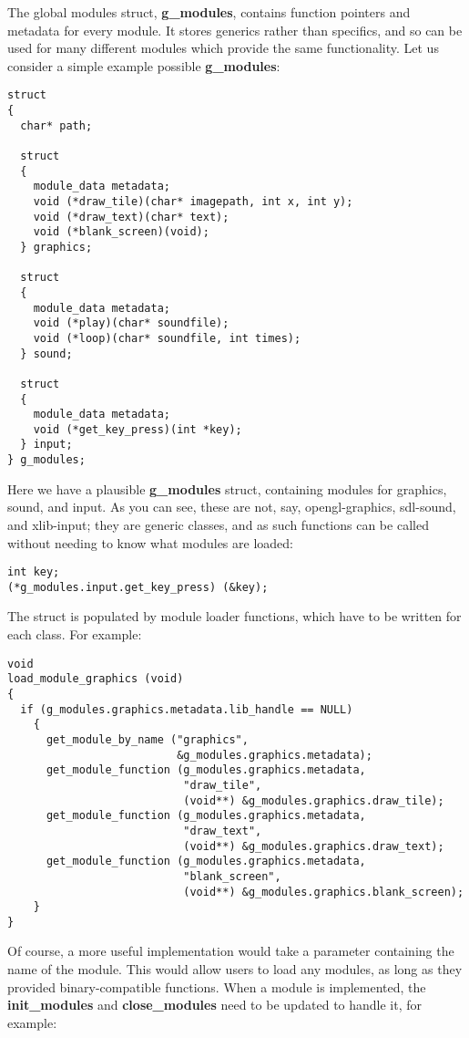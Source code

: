 \documentclass[12pt,a4paper]{article}
\begin{document}
The global modules struct, \textbf{g\_modules}, contains function pointers and metadata for every module. It stores generics rather than specifics, and so can be used for many different modules which provide the same functionality. Let us consider a simple example possible \textbf{g\_modules}:

\begin{lstlisting}
struct
{
  char* path;

  struct
  {
    module_data metadata;
    void (*draw_tile)(char* imagepath, int x, int y);
    void (*draw_text)(char* text);
    void (*blank_screen)(void);
  } graphics;

  struct
  {
    module_data metadata;
    void (*play)(char* soundfile);
    void (*loop)(char* soundfile, int times);
  } sound;

  struct
  {
    module_data metadata;
    void (*get_key_press)(int *key);
  } input;
} g_modules;
\end{lstlisting}

Here we have a plausible \textbf{g\_modules} struct, containing modules for graphics, sound, and input. As you can see, these are not, say, opengl-graphics, sdl-sound, and xlib-input; they are generic classes, and as such functions can be called without needing to know what modules are loaded:

\begin{lstlisting}
int key;
(*g_modules.input.get_key_press) (&key);
\end{lstlisting}

The struct is populated by module loader functions, which have to be written for each class. For example:

\begin{lstlisting}
void
load_module_graphics (void)
{
  if (g_modules.graphics.metadata.lib_handle == NULL)
    {
      get_module_by_name ("graphics",
                          &g_modules.graphics.metadata);
      get_module_function (g_modules.graphics.metadata,
                           "draw_tile",
                           (void**) &g_modules.graphics.draw_tile);
      get_module_function (g_modules.graphics.metadata,
                           "draw_text",
                           (void**) &g_modules.graphics.draw_text);
      get_module_function (g_modules.graphics.metadata,
                           "blank_screen",
                           (void**) &g_modules.graphics.blank_screen);
    }
}
\end{lstlisting}

Of course, a more useful implementation would take a parameter containing the name of the module. This would allow users to load any modules, as long as they provided binary-compatible functions. When a module is implemented, the \textbf{init\_modules} and \textbf{close\_modules} need to be updated to handle it, for example:
\end{document}
